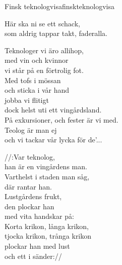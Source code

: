 \begin{song}{Finsk teknologvisa}{finskteknologvisa}
\begin{vers}
Här ska ni se ett schack,\\
som aldrig tappar takt, faderalla.
\end{vers}
\begin{vers}
Teknologer vi äro allihop,\\
med vin och kvinnor\\%
vi står på en förtrolig fot.\\
Med tofs i mössan\\
och sticka i vår hand\\
jobba vi flitigt\\
dock helst uti ett vingårdsland.\\
På exkursioner, och fester är vi med.\\
Teolog är man ej\\
och vi tackar vår lycka för de'...\\
\end{vers}
\begin{vers}
//:Var teknolog,\\
han är en vingårdens man.\\ %
Varthelst i staden man såg,\\
där rantar han.\\ %
Lustgårdens frukt,\\
den plockar han\\ %
med vita handskar på:\\
Korta krikon, långa krikon,\\ %
tjocka krikon, trånga krikon\\ %
plockar han med lust\\ %
och ett i sänder://\\
\end{vers}
\end{song}
\newpage

